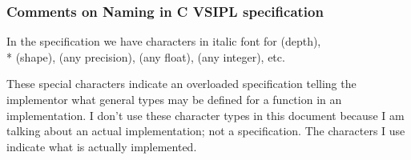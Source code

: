 \subsubsection*{Comments on Naming in C VSIPL specification}
In the \cvl specification we have characters in italic font for  (depth), \\*  (shape),  (any precision),  (any float),  (any integer), etc. 

These special characters indicate an overloaded specification telling the implementor what general types may be defined for a function in an implementation.   I don't use these character types in this document because I am talking about an actual implementation; not a specification.  The characters I use indicate what is actually implemented.